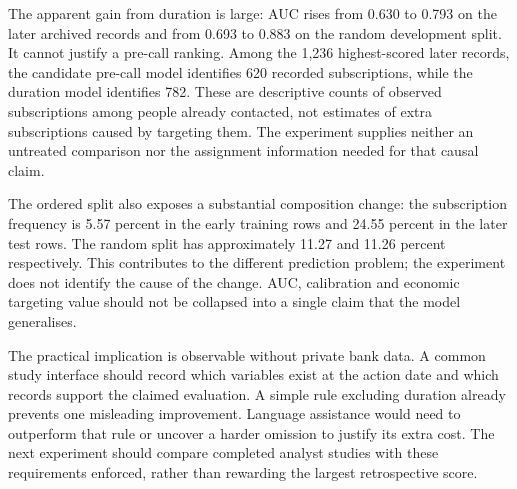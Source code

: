 The apparent gain from duration is large: AUC rises from 0.630 to 0.793 on the
later archived records and from 0.693 to 0.883 on the random development split.
It cannot justify a pre-call ranking. Among the 1,236 highest-scored later
records, the candidate pre-call model identifies 620 recorded subscriptions,
while the duration model identifies 782. These are descriptive counts of
observed subscriptions among people already contacted, not estimates of extra
subscriptions caused by targeting them. The experiment supplies neither an
untreated comparison nor the assignment information needed for that causal
claim.

The ordered split also exposes a substantial composition change: the
subscription frequency is 5.57 percent in the early training rows and 24.55
percent in the later test rows. The random split has approximately 11.27 and
11.26 percent respectively. This contributes to the different prediction
problem; the experiment does not identify the cause of the change. AUC,
calibration and economic targeting value should not be collapsed into a single
claim that the model generalises.

The practical implication is observable without private bank data. A common
study interface should record which variables exist at the action date and
which records support the claimed evaluation. A simple rule excluding duration
already prevents one misleading improvement. Language assistance would need
to outperform that rule or uncover a harder omission to justify its extra
cost. The next experiment should compare completed analyst studies with these
requirements enforced, rather than rewarding the largest retrospective score.



